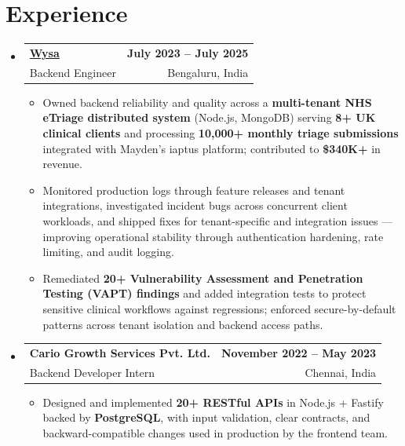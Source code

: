 \documentclass[letterpaper,10pt]{article}
\makeatletter
\newcommand{\resumeItem}[1]{
  \item\small{#1\vspace{-1pt}}
}
\newcommand{\resumeSubheading}[4]{
  \vspace{1pt}\item
    \begin{tabular*}{0.985\textwidth}[t]{l@{\extracolsep{\fill}}r}
      \textbf{#1} & \textbf{\small #2} \\
      {\small\color{ResumeSlate} #3} & {\small\color{ResumeSlate} #4} \\
    \end{tabular*}\vspace{-6pt}
}
\newcommand{\resumeSubHeadingListStart}{\begin{itemize}[leftmargin=0.0in, label={}, itemsep=2pt, topsep=2pt]}
\newcommand{\resumeSubHeadingListEnd}{\end{itemize}}
\newcommand{\resumeItemListStart}{\begin{itemize}[leftmargin=0.18in, itemsep=2pt, topsep=1pt]}
\newcommand{\resumeItemListEnd}{\end{itemize}\vspace{-4pt}}
\makeatother
\begin{document}
\section{Experience}
\resumeSubHeadingListStart
  \resumeSubheading
    {\href{https://www.wysa.io}{Wysa}}{July 2023 -- July 2025}
    {Backend Engineer}{Bengaluru, India}
    \resumeItemListStart
      \resumeItem{Owned backend reliability and quality across a \textbf{multi-tenant NHS eTriage distributed system} (Node.js, MongoDB) serving \textbf{8+ UK clinical clients} and processing \textbf{10{,}000+ monthly triage submissions} integrated with Mayden's iaptus platform; contributed to \textbf{\$340K+} in revenue.}
      \resumeItem{Monitored production logs through feature releases and tenant integrations, investigated incident bugs across concurrent client workloads, and shipped fixes for tenant-specific and integration issues --- improving operational stability through authentication hardening, rate limiting, and audit logging.}
      \resumeItem{Remediated \textbf{20+ Vulnerability Assessment and Penetration Testing (VAPT) findings} and added integration tests to protect sensitive clinical workflows against regressions; enforced secure-by-default patterns across tenant isolation and backend access paths.}
    \resumeItemListEnd
  \resumeSubheading
    {Cario Growth Services Pvt. Ltd.}{November 2022 -- May 2023}
    {Backend Developer Intern}{Chennai, India}
    \resumeItemListStart
      \resumeItem{Designed and implemented \textbf{20+ RESTful APIs} in Node.js + Fastify backed by \textbf{PostgreSQL}, with input validation, clear contracts, and backward-compatible changes used in production by the frontend team.}
    \resumeItemListEnd
\resumeSubHeadingListEnd
\vspace{-4pt}
\end{document}
